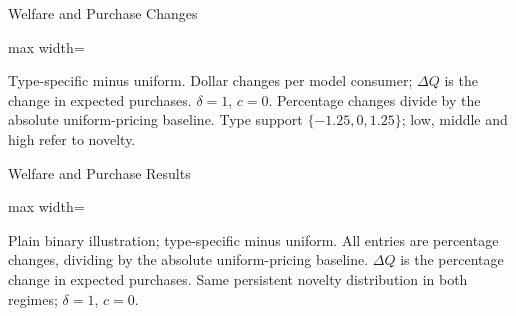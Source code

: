 \gdef\shortbuttons{\hyperlink{short-theory-welfare}{\beamergotobutton{Back}}}
\begin{frame}[label=short-theory-welfare-table,noframenumbering]{Welfare and Purchase Changes}
  \centering\small
  \begin{adjustbox}{max width=\linewidth}
    
  \end{adjustbox}
  \par\medskip\raggedright\footnotesize Type-specific minus uniform. Dollar changes per model consumer;
  $\Delta Q$ is the change in expected purchases. $\delta=1$, $c=0$.
  Percentage changes divide by the absolute uniform-pricing baseline.
  Type support $\{-1.25,0,1.25\}$; low, middle and high refer to novelty.
\end{frame}

\gdef\shortbuttons{\hyperlink{short-pricing-welfare}{\beamergotobutton{Back}}}
\begin{frame}[label=short-pricing-welfare-table,noframenumbering]{Welfare and Purchase Results}
  \centering\small
  \begin{adjustbox}{max width=\linewidth}
    
  \end{adjustbox}
  \par\medskip\raggedright\footnotesize Plain binary illustration; type-specific minus uniform.
  All entries are percentage changes, dividing by the absolute uniform-pricing baseline.
  $\Delta Q$ is the percentage change in expected purchases.
  Same persistent novelty distribution in both regimes; $\delta=1$, $c=0$.
\end{frame}
